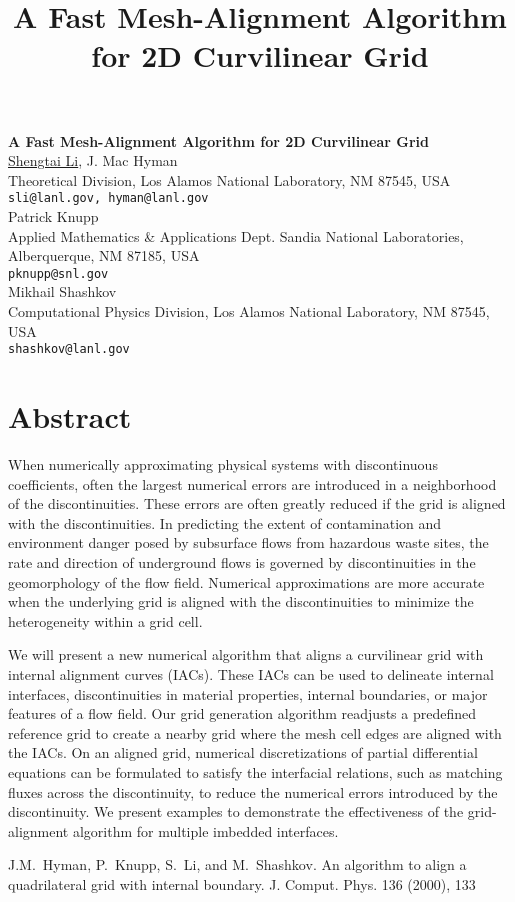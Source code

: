 \title{A Fast Mesh-Alignment Algorithm for 2D Curvilinear Grid}
\author{} \institute{}

\begin{center}

\textbf{\Large A Fast Mesh-Alignment Algorithm for 2D Curvilinear Grid}\\
\vspace{10mm}
{\large\underline{Shengtai Li}, J. Mac Hyman}\\
Theoretical Division, Los Alamos National Laboratory, NM 87545, USA\\
{\tt sli@lanl.gov, hyman@lanl.gov}\\
\vspace{4mm}
{\large Patrick Knupp} \\
Applied Mathematics \& Applications Dept.
Sandia National Laboratories, 
Alberquerque, NM 87185, USA \\
{\tt pknupp@snl.gov}\\
\vspace{4mm}
{\large Mikhail Shashkov} \\
Computational Physics Division, Los Alamos National Laboratory, NM
87545, USA \\ 
{\tt shashkov@lanl.gov}

\end{center}

\section*{Abstract}

When numerically approximating physical systems with discontinuous coefficients, often the largest numerical errors are introduced in a neighborhood of the discontinuities. These errors are often greatly reduced if the grid is aligned with the discontinuities. In predicting the extent of contamination and environment danger posed by subsurface flows from hazardous waste sites, the rate and direction of underground flows is governed by discontinuities in the geomorphology of the flow field.  Numerical approximations are more accurate when the underlying grid is  aligned with the discontinuities to minimize the heterogeneity  within a grid cell.

We will present a new numerical algorithm that aligns a curvilinear grid with internal alignment curves (IACs).  These IACs can be used to delineate internal interfaces, discontinuities in material properties, internal boundaries, or major features of a flow field. Our grid generation algorithm readjusts a predefined reference grid to create a nearby grid where the mesh cell edges are aligned with the IACs.  On an aligned grid, numerical discretizations of partial differential
equations can be formulated to satisfy the interfacial relations, such as matching fluxes across the discontinuity, to  reduce the numerical errors introduced by the discontinuity.  We present  examples to demonstrate the effectiveness of the grid-alignment algorithm for multiple imbedded interfaces.   


\begin{thebibliography}{10}

{\sc J.M.~Hyman, P.~Knupp, S.~Li, and M.~Shashkov}. {An algorithm to align a
quadrilateral grid with internal boundary}. J. Comput. Phys. 136
(2000),  133

\end{thebibliography}
